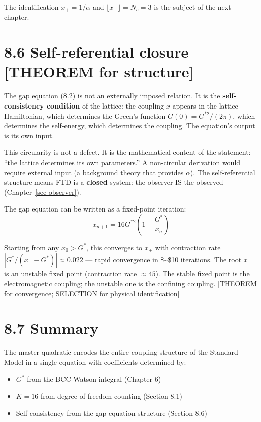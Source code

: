 \documentclass[
  11pt,
  letterpaper,
  twoside,
  openright]{book}
\providecommand{\tightlist}{%
  \setlength{\itemsep}{0pt}\setlength{\parskip}{0pt}}
\begin{document}
The identification \(x_+ = 1/\alpha\) and
\(\lfloor x_- \rfloor = N_c = 3\) is the subject of the next chapter.

\section{8.6 Self-referential closure {[}THEOREM for
structure{]}}\label{self-referential-closure-theorem-for-structure}

The gap equation (8.2) is not an externally imposed relation. It is the
\textbf{self-consistency condition} of the lattice: the coupling \(x\)
appears in the lattice Hamiltonian, which determines the Green's
function \(G(0) = G^{*2}/(2\pi)\), which determines the self-energy,
which determines the coupling. The equation's output is its own input.

This circularity is not a defect. It is the mathematical content of the
statement: ``the lattice determines its own parameters.'' A non-circular
derivation would require external input (a background theory that
provides \(\alpha\)). The self-referential structure means FTD is a
\textbf{closed} system: the observer IS the observed
(Chapter~\ref{sec-observer}).

The gap equation can be written as a fixed-point iteration: \[
x_{n+1} = 16G^{*2}\left(1 - \frac{G^*}{x_n}\right)
\tag{8.7}
\]

Starting from any \(x_0 > G^*\), this converges to \(x_+\) with
contraction rate \(|G^*/(x_+ - G^*)| \approx 0.022\) --- rapid
convergence in \$\sim\$10 iterations. The root \(x_-\) is an unstable
fixed point (contraction rate \(\approx 45\)). The stable fixed point is
the electromagnetic coupling; the unstable one is the confining
coupling. {[}THEOREM for convergence; SELECTION for physical
identification{]}

\section{8.7 Summary}\label{summary-1}

The master quadratic encodes the entire coupling structure of the
Standard Model in a single equation with coefficients determined by:

\begin{itemize}
\tightlist
\item
  \(G^*\) from the BCC Watson integral (Chapter 6)
\item
  \(K = 16\) from degree-of-freedom counting (Section 8.1)
\item
  Self-consistency from the gap equation structure (Section 8.6)
\end{itemize}
\end{document}
